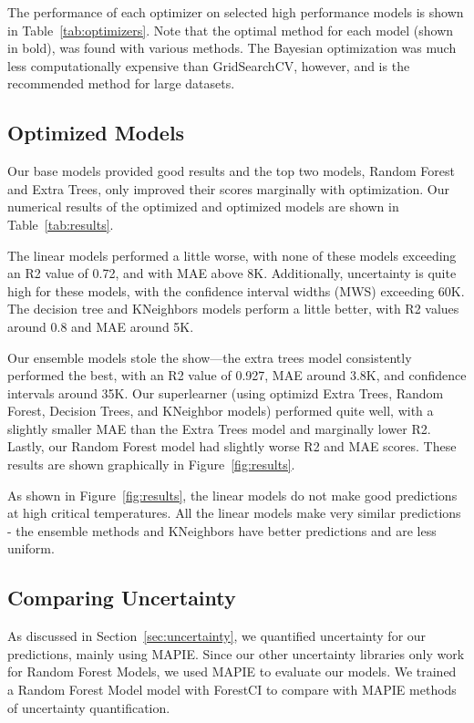 \documentclass[twocolumn, nofootinbib, secnumarabic, amssymb, nobibnotes, aps, prd]{revtex4-2}
\begin{document}
\clearpage

The performance of each optimizer on selected high performance models is shown in Table~\ref{tab:optimizers}. Note that the optimal method for each model (shown in bold), was found with various methods. The Bayesian optimization was much less computationally expensive than GridSearchCV, however, and is the recommended method for large datasets.

\subsection{Optimized Models}\label{sec:optimized-models} %

Our base models provided good results and the top two models, Random Forest and Extra Trees, only improved their scores marginally with optimization. Our numerical results of the optimized and optimized models are shown in Table~\ref{tab:results}.

The linear models performed a little worse, with none of these models exceeding an R2 value of 0.72, and with MAE above 8K. Additionally, uncertainty is quite high for these models, with the confidence interval widths (MWS) exceeding 60K. The decision tree and KNeighbors models perform a little better, with R2 values around 0.8 and MAE around 5K. 

Our ensemble models stole the show—the extra trees model consistently performed the best, with an R2 value of 0.927, MAE around 3.8K, and confidence intervals around 35K. Our superlearner (using optimizd Extra Trees, Random Forest, Decision Trees, and KNeighbor models) performed quite well, with a slightly smaller MAE than the Extra Trees model and marginally lower R2. Lastly, our Random Forest model had slightly worse R2 and MAE scores. These results are shown graphically in Figure~\ref{fig:results}.

As shown in Figure~\ref{fig:results}, the linear models do not make good predictions at high critical temperatures. All the linear models make very similar predictions - the ensemble methods and KNeighbors have better predictions and are less uniform.

\subsection{Comparing Uncertainty}
As discussed in Section~\ref{sec:uncertainty}, we quantified uncertainty for our predictions, mainly using MAPIE. Since our other uncertainty libraries only work for Random Forest Models, we used MAPIE to evaluate our models. We trained a Random Forest Model model with ForestCI to compare with MAPIE methods of uncertainty quantification. 
\end{document}
